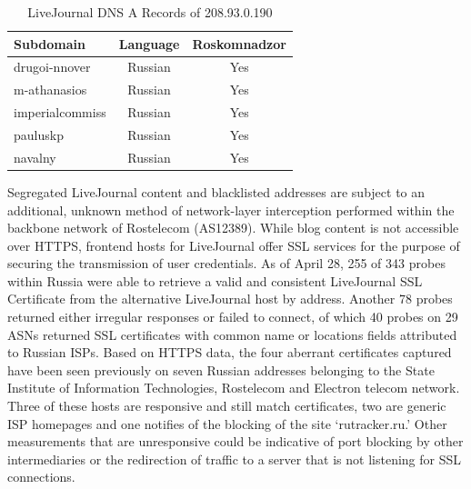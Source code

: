 \begin{table}
    \begin{tabular}{l | c | c}
        \textbf{Subdomain} & \textbf{Language} & \textbf{Roskomnadzor}\\
        \hline
        drugoi-nnover & Russian & Yes\\
        m-athanasios & Russian & Yes\\
        imperialcommiss & Russian & Yes\\
        pauluskp & Russian & Yes \\
        navalny & Russian & Yes \\
        \hline
    \end{tabular}
    \caption{LiveJournal DNS A Records of 208.93.0.190}
    \label{table:lj-blocked-blogs}
\end{table}

Segregated LiveJournal content and blacklisted addresses are subject to an
additional, unknown method of network-layer interception performed within the
backbone network of Rostelecom (AS12389). While blog content is not
accessible over HTTPS, frontend hosts for LiveJournal offer SSL services for the purpose of
securing the transmission of user credentials. As of April 28, 255 of 343
probes within Russia were able to retrieve a valid and consistent LiveJournal
SSL Certificate from the alternative LiveJournal host by address. Another 78
probes returned either irregular responses or failed to connect, of which 40
probes on 29 ASNs returned SSL certificates with common name or locations
fields attributed to Russian ISPs. Based on HTTPS data, the four aberrant
certificates captured have been seen previously on seven Russian addresses
belonging to the State Institute of Information Technologies, Rostelecom and
Electron telecom network. Three of these hosts are responsive and still match
certificates, two are generic ISP homepages and one notifies of the blocking of
the site `rutracker.ru.' Other measurements that are unresponsive could be
indicative of port blocking by other intermediaries or the redirection of
traffic to a server that is not listening for SSL connections.

